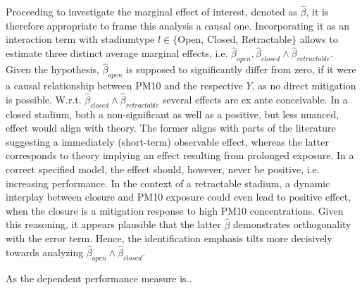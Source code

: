\documentclass[12pt,a4paper]{article}
\begin{document}
{Proceeding to investigate the marginal effect of interest, denoted as $\hat{\beta}$, it is therefore appropriate to frame this analysis a causal one.  Incorporating it as an interaction term with stadiumtype $l \in \{$Open, Closed, Retractable$\}$ allows to estimate three distinct average marginal effects, i.e. $\hat{\beta}_{open},\hat{\beta}_{closed} \wedge \hat{\beta}_{retractable}$. Given the hypothesis, $\hat{\beta}_{open}$ is supposed to significantly differ from zero, if it were a causal relationship between PM10 and the respective $Y$, as no direct mitigation is possible. W.r.t. $\hat{\beta}_{closed} \wedge \hat{\beta}_{retractable}$ several effects are ex ante conceivable. In a closed stadium, both a non-significant as well as a positive, but less nuanced, effect would align with theory. The former aligns with parts of the literature suggesting a immediately (short-term)  observable effect, whereas the latter corresponds to theory implying an effect resulting from prolonged exposure. In a correct specified model, the effect should, however, never be positive, i.e. increasing performance. In the context of a retractable stadium, a dynamic interplay between closure and PM10 exposure could even lead to positive effect, when the closure is a mitigation response to high PM10 concentrations. Given this reasoning, it appears plausible that the latter $\hat{\beta}$ demonstrates orthogonality with the error term. Hence, the identification emphasis tilts more decisively towards analyzing $\hat{\beta}_{open} \wedge \hat{\beta}_{closed}$.

As the dependent performance measure is..

}
\end{document}
